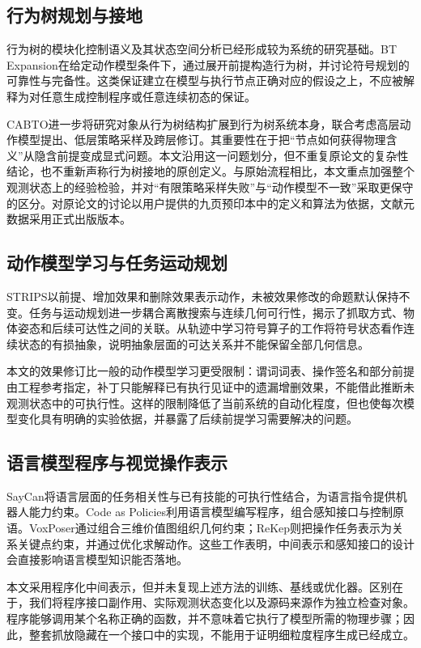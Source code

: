\documentclass[UTF8,zihao=-4,fontset=fandol,a4paper]{ctexart}
\begin{document}
\subsection{行为树规划与接地}
行为树的模块化控制语义及其状态空间分析已经形成较为系统的研究基础\cite{btbook2018}。BT Expansion在给定动作模型条件下，通过展开前提构造行为树，并讨论符号规划的可靠性与完备性\cite{btexp2021}。这类保证建立在模型与执行节点正确对应的假设之上，不应被解释为对任意生成控制程序或任意连续初态的保证。

CABTO进一步将研究对象从行为树结构扩展到行为树系统本身，联合考虑高层动作模型提出、低层策略采样及跨层修订\cite{cabto2026}。其重要性在于把“节点如何获得物理含义”从隐含前提变成显式问题。本文沿用这一问题划分，但不重复原论文的复杂性结论，也不重新声称行为树接地的原创定义。与原始流程相比，本文重点加强整个观测状态上的经验检验，并对“有限策略采样失败”与“动作模型不一致”采取更保守的区分。对原论文的讨论以用户提供的九页预印本中的定义和算法为依据，文献元数据采用正式出版版本。

\subsection{动作模型学习与任务运动规划}
STRIPS以前提、增加效果和删除效果表示动作，未被效果修改的命题默认保持不变\cite{strips1971}。任务与运动规划进一步耦合离散搜索与连续几何可行性，揭示了抓取方式、物体姿态和后续可达性之间的关联\cite{tamp2021}。从轨迹中学习符号算子的工作将符号状态看作连续状态的有损抽象，说明抽象层面的可达关系并不能保留全部几何信息\cite{silver2021}。

本文的效果修订比一般的动作模型学习更受限制：谓词词表、操作签名和部分前提由工程参考指定，补丁只能解释已有执行见证中的遗漏增删效果，不能借此推断未观测状态中的可执行性。这样的限制降低了当前系统的自动化程度，但也使每次模型变化具有明确的实验依据，并暴露了后续前提学习需要解决的问题。

\subsection{语言模型程序与视觉操作表示}
SayCan将语言层面的任务相关性与已有技能的可执行性结合，为语言指令提供机器人能力约束\cite{saycan2023}。Code as Policies利用语言模型编写程序，组合感知接口与控制原语\cite{cap2023}。VoxPoser通过组合三维价值图组织几何约束\cite{voxposer2023}；ReKep则把操作任务表示为关系关键点约束，并通过优化求解动作\cite{rekep2025}。这些工作表明，中间表示和感知接口的设计会直接影响语言模型知识能否落地。

本文采用程序化中间表示，但并未复现上述方法的训练、基线或优化器。区别在于，我们将程序接口副作用、实际观测状态变化以及源码来源作为独立检查对象。程序能够调用某个名称正确的函数，并不意味着它执行了模型所需的物理步骤；因此，整套抓放隐藏在一个接口中的实现，不能用于证明细粒度程序生成已经成立。
\end{document}
